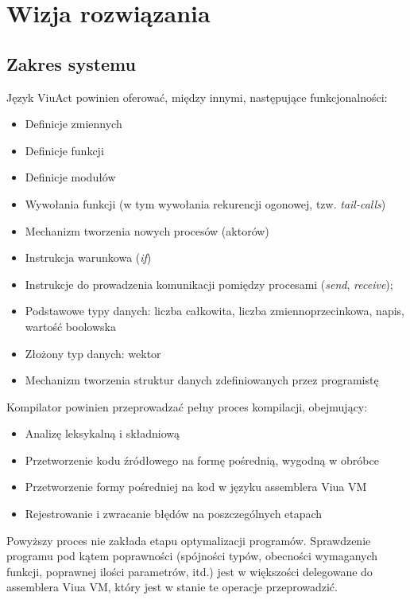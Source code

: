 \documentclass[11pt,oneside,a4paper,titlepage,onecolumn]{article}
\begin{document}
\section{Wizja rozwiązania}

\subsection{Zakres systemu}

Język ViuAct powinien oferować, między innymi, następujące funkcjonalności:

\begin{itemize}
	\item Definicje zmiennych
    \item Definicje funkcji
    \item Definicje modułów
    \item Wywołania funkcji (w tym wywołania rekurencji ogonowej, tzw. \emph{tail-calls})
    \item Mechanizm tworzenia nowych procesów (aktorów)
	\item Instrukcja warunkowa (\emph{if})
	\item Instrukcje do prowadzenia komunikacji pomiędzy procesami (\emph{send}, \emph{receive});
    \item Podstawowe typy danych: liczba całkowita, liczba zmiennoprzecinkowa, napis, wartość boolowska
    \item Złożony typ danych: wektor
	\item Mechanizm tworzenia struktur danych zdefiniowanych przez programistę
\end{itemize}

Kompilator powinien przeprowadzać pełny proces kompilacji, obejmujący:

\begin{itemize}
	\item Analizę leksykalną i składniową
    \item Przetworzenie kodu źródłowego na formę pośrednią, wygodną w obróbce
    \item Przetworzenie formy pośredniej na kod w języku assemblera Viua VM
	\item Rejestrowanie i zwracanie błędów na poszczególnych etapach
\end{itemize}

Powyższy proces nie zakłada etapu optymalizacji programów.
Sprawdzenie programu pod kątem poprawności (spójności typów, obecności wymaganych funkcji, poprawnej ilości
parametrów, itd.) jest w większości delegowane do assemblera Viua VM, który jest w stanie te operacje
przeprowadzić.
\end{document}
